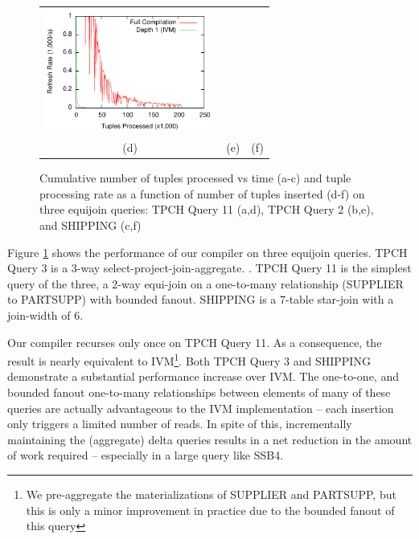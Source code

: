 \begin{figure}
\begin{center}
\begin{tabular}{ccc}
\includegraphics[width=2.2in]{../graphs/graphs/windowedrate_ssb4.pdf} \\
(d) & (e) & (f) \\
\end{tabular}
\caption{Cumulative number of tuples processed vs time (a-c) and tuple processing rate as a function of number of tuples inserted (d-f) on three equijoin queries: TPCH Query 11 (a,d), TPCH Query 2 (b,e), and SHIPPING (c,f)}
\label{fig:experiments:equijoin}
\end{center}
\end{figure}

Figure \ref{fig:experiments:equijoin} shows the performance of our compiler on three equijoin queries.  TPCH Query 3 is a 3-way select-project-join-aggregate.  .  TPCH Query 11 is the simplest query of the three, a 2-way equi-join on a one-to-many relationship (SUPPLIER to PARTSUPP) with bounded fanout.  SHIPPING is a 7-table star-join with a join-width of 6.  

Our compiler recurses only once on TPCH Query 11.  As a consequence, the result is nearly equivalent to IVM\footnote{We pre-aggregate the materializations of SUPPLIER and PARTSUPP, but this is only a minor improvement in practice due to the bounded fanout of this query}.  Both TPCH Query 3 and SHIPPING demonstrate a substantial performance increase over IVM.  The one-to-one, and bounded fanout one-to-many relationships between elements of many of these queries are actually advantageous to the IVM implementation -- each insertion only triggers a limited number of reads.  In spite of this, incrementally maintaining the (aggregate) delta queries results in a net reduction in the amount of work required -- especially in a large query like SSB4.


